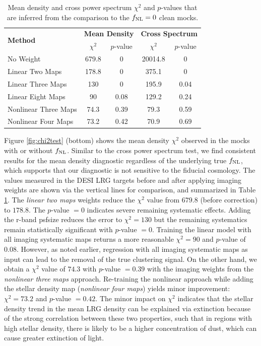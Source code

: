 \begin{table}
  \caption{Mean density and cross power spectrum $\chi^{2}$ and $p$-values that are inferred from the comparison to the $f_{\rm NL}=0$ clean mocks.}\label{tab:chi2test}
  \begin{tabular}{lcccc}
    \hline
    \hline
    \multirow{2}{*}{\textbf{Method}} &
      \multicolumn{2}{c}{\textbf{Mean Density}} &
      \multicolumn{2}{c}{\textbf{Cross Spectrum}} \\
    & $\chi^{2}$ & $p$-value & $\chi^{2}$ & $p$-value \\
    \hline
   No Weight & 679.8 & 0 & 20014.8 & 0 \\
   Linear Two Maps & 178.8 & 0 & 375.1 & 0\\
   Linear Three Maps & 130 & 0 & 195.9 & 0.04\\
   Linear Eight Maps & 90 & 0.08 & 129.2 & 0.24\\
   Nonlinear Three Maps & 74.3 & 0.39  & 79.3 & 0.59\\
   Nonlinear Four Maps & 73.2 & 0.42 & 70.9 & 0.69\\    
    \hline
  \end{tabular}
\end{table}


Figure \ref{fig:chi2test} (bottom) shows the mean density $\chi^{2}$ observed in the mocks with or without $f_{\rm NL}$. Similar to the cross power spectrum test, we find consistent results for the mean density diagnostic regardless of the underlying true $f_{\rm NL}$, which supports that our diagnostic is not sensitive to the fiducial cosmology. The values measured in the DESI LRG targets before and after applying imaging weights are shown via the vertical lines for comparison, and summarized in Table \ref{tab:chi2test}. The \textit{linear two maps} weights reduce the $\chi^{2}$ value from $679.8$ (before correction) to $178.8$. The $p$-value $=0$ indicates severe remaining systematic effects. Adding the r-band psfsize reduces the error to $\chi^{2}=130$ but the remaining systematics remain statistically significant with $p$-value $=0$. Training the linear model with all imaging systematic maps returns a more reasonable $\chi^{2}=90$ and $p$-value of $0.08$. However, as noted earlier, regression with all imaging systematic maps as input can lead to the removal of the true clustering signal. On the other hand, we obtain a $\chi^{2}$ value of $74.3$ with $p$-value $=0.39$ with the imaging weights from the \textit{nonlinear three maps} approach. Re-training the nonlinear approach while adding the stellar density map (\textit{nonlinear four maps}) yields minor improvement: $\chi^{2}=73.2$ and $p$-value $=0.42$. The minor impact on $\chi^{2}$ indicates that the stellar density trend in the mean LRG density can be explained via extinction because of the strong correlation between these two properties, such that in regions with high stellar density, there is likely to be a higher concentration of dust, which can cause greater extinction of light.



